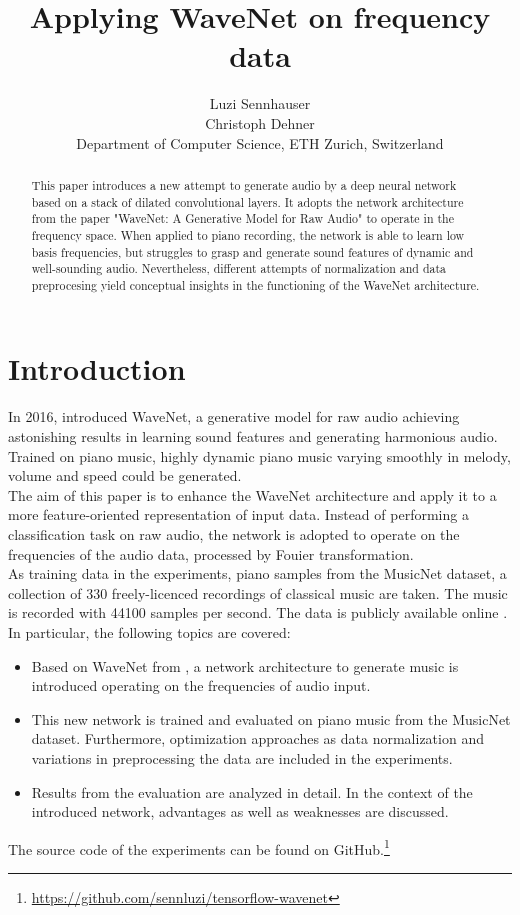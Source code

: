 \documentclass[10pt,conference,compsocconf]{IEEEtran}
\begin{document}
\title{Applying WaveNet on frequency data}

\author{
  Luzi Sennhauser\\
  Christoph Dehner\\
  Department of Computer Science, ETH Zurich, Switzerland
}

\maketitle

\begin{abstract}
	This paper introduces a new attempt to generate audio by a deep neural network based on a stack of dilated convolutional layers. It adopts the network architecture from the paper "WaveNet: A Generative Model for Raw Audio" to operate in the frequency space. When applied to piano recording, the network is able to learn low basis frequencies, but struggles to grasp and generate sound features of dynamic and well-sounding audio. Nevertheless, different attempts of normalization and data preprocesing yield conceptual insights in the functioning of the WaveNet architecture.
\end{abstract}

\section{Introduction}
In 2016, \cite{wavenet} introduced WaveNet, a generative model for raw audio achieving astonishing results in learning sound features and generating harmonious audio. Trained on piano music, highly dynamic piano music varying smoothly in melody, volume and speed could be generated.\\
The aim of this paper is to enhance the WaveNet architecture and apply it to a more feature-oriented representation of input data. Instead of performing a classification task on raw audio, the network is adopted to operate on the frequencies of the audio data, processed by Fouier transformation.\\
As training data in the experiments, piano samples from the MusicNet dataset, a collection of 330 freely-licenced recordings of classical music are taken. The music is recorded with 44100 samples per second. The data is publicly available online \cite{musicnet}.\\
In particular, the following topics are covered:
\begin{itemize}
\item Based on WaveNet from \cite{wavenet}, a network architecture to generate music is introduced operating on the frequencies of audio input.
\item This new network is trained and evaluated on piano music from the MusicNet dataset. Furthermore, optimization approaches as data normalization and variations in preprocessing the data are included in the experiments.
\item Results from the evaluation are analyzed in detail. In the context of the introduced network, advantages as well as weaknesses are discussed. 
\end{itemize}
The source code of the experiments can be found on GitHub.\footnote{\url{https://github.com/sennluzi/tensorflow-wavenet}}
\end{document}
